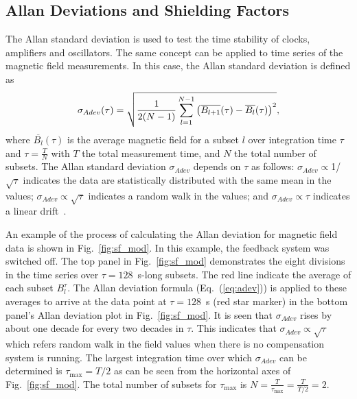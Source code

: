  \subsection{Allan Deviations and Shielding Factors}
 
The Allan standard deviation \cite{allan} is used to test the time stability of clocks, amplifiers and oscillators. The same concept can be applied to time series of the magnetic field measurements. In this case, the Allan standard deviation is defined as~\cite{bea}
\begin{equation}\label{eq:adev}
    \sigma_{Adev} (\tau)=\sqrt{\frac{1}{2(N-1)}\sum_{l=1}^{N-1} \left(\overline{B_{l+1}}(\tau)-\overline{B_l}(\tau)\right)^2}{\rm ,}
\end{equation}
where $\overline{B_l}(\tau)$ is the average magnetic field for a subset $l$ over integration time $\tau$ and $\tau = \frac{T}{N}$ with $T$ the total measurement time, and $N$ the total number of subsets. The Allan standard deviation $\sigma_{Adev}$ depends on $\tau$ as follows: $\sigma_{Adev}\propto$1/$\sqrt{\tau}$ indicates the data are statistically distributed with the same mean in the values; $\sigma_{Adev}\propto \sqrt{\tau}$ indicates a random walk in the values; and $\sigma_{Adev}\propto\tau$ indicates a linear drift~\cite{allan_tau,allan_taraneh}. 



An example of the process of calculating the Allan deviation for magnetic field data is shown in Fig.~\ref{fig:sf_mod}. In this example, the feedback system was switched off. The top panel in Fig.~\ref{fig:sf_mod} demonstrates the eight divisions in the time series over $\tau=128$~s-long subsets. The red line indicate the average of each subset $B_l^{\tau}$. The Allan deviation formula (Eq.~(\ref{eq:adev})) is applied to these averages to arrive at the data point at $\tau=128$~s (red star marker) in the bottom panel's Allan deviation plot in Fig.~\ref{fig:sf_mod}.  It is seen that $\sigma_{Adev}$ rises by about one decade for every two decades in $\tau$. This indicates that $\sigma_{Adev}\propto \sqrt{\tau}$ which refers random walk in the field values when there is no compensation system is running. The largest integration time over which $\sigma_{Adev}$ can be determined is $\tau_{\text{max}}=T/2$ as can be seen from the horizontal axes of Fig.~\ref{fig:sf_mod}. The total number of subsets for $\tau_{\text{max}}$ is $N = \frac{T}{\tau_{\text{max}}}=\frac{T}{T/2}=2$. 

